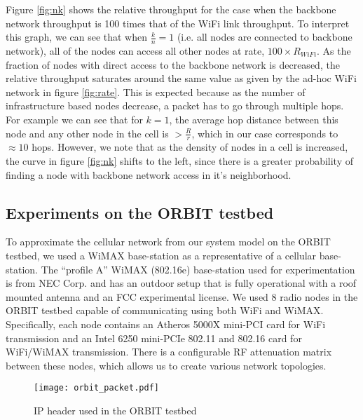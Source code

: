 \documentclass{sig-alternate-10pt}
\begin{document}
Figure \ref{fig:nk} shows the relative throughput for the case when the backbone network throughput is 100 times that of the WiFi link throughput. To interpret this graph, we can see that when $\frac{k}{n} = 1$ (i.e. all nodes are connected to backbone network), all of the nodes can access all other nodes at rate, $100\times R_{WiFi}$. As the fraction of nodes with direct access to the backbone network is decreased, the relative throughput saturates  around the same value as given by the ad-hoc WiFi network in figure \ref{fig:rate}. This is expected because as the number of infrastructure based nodes decrease, a packet has to go through multiple hops. For example we can see that for $k=1$, the average hop distance between this node and any other node in the cell is $> \frac{R}{r}$, which in our case corresponds to $\approx 10$ hops.  However, we note that as the density of nodes in a cell is increased, the curve in figure \ref{fig:nk} shifts to the left, since there is a greater probability of finding a node with backbone network access in it's neighborhood.

\subsection{Experiments on the ORBIT testbed}
To approximate the cellular network from our system model on the ORBIT testbed, we used a WiMAX base-station as a representative  of a cellular base-station. The “profile A” WiMAX (802.16e) base-station used for experimentation is from NEC Corp. and has an outdoor setup that is fully operational with a roof mounted antenna and an FCC experimental license. We used 8 radio nodes in the ORBIT testbed capable of communicating using both WiFi and WiMAX. Specifically, each node contains an Atheros 5000X mini-PCI card for WiFi transmission and an Intel 6250 mini-PCIe 802.11 and 802.16 card for WiFi/WiMAX transmission. There is a configurable RF attenuation matrix between these nodes, which allows us to create various network topologies.

\begin{figure}[t]
\begin{center}
\texttt{[image: orbit\_packet.pdf]}
\end{center}
\caption{IP header used in the ORBIT testbed}
\label{fig:orbit_packet}
\end{figure}
\end{document}
